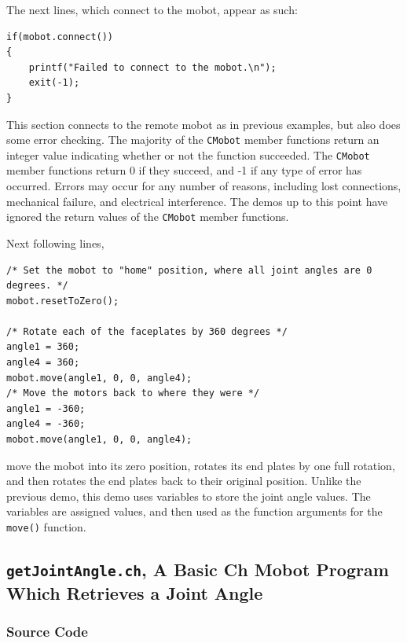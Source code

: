 \documentclass{article}
\begin{document}
The next
lines, which connect to the mobot, appear as such:
\begin{verbatim}
if(mobot.connect())
{
    printf("Failed to connect to the mobot.\n");
    exit(-1);
}
\end{verbatim}
This section connects to the remote mobot as in previous examples, but also
does some error checking. The majority of the \texttt{CMobot} member functions
return an integer value indicating whether or not the function succeeded.
The \texttt{CMobot} member functions return 0 if they succeed, and -1
if any type of error has occurred. Errors may occur for any number of reasons,
including lost connections, mechanical failure, and electrical interference. 
The demos up to this point have ignored the return values of the 
\texttt{CMobot} member functions.

Next following lines,
\begin{verbatim}
/* Set the mobot to "home" position, where all joint angles are 0 degrees. */
mobot.resetToZero();

/* Rotate each of the faceplates by 360 degrees */
angle1 = 360;
angle4 = 360;
mobot.move(angle1, 0, 0, angle4);
/* Move the motors back to where they were */
angle1 = -360;
angle4 = -360;
mobot.move(angle1, 0, 0, angle4);
\end{verbatim}
move the mobot into its zero position, rotates its end plates by one full rotation, and then
rotates the end plates back to their original position. Unlike the previous demo, this 
demo uses variables to store the joint angle values. The variables are assigned 
values, and then used as the function arguments for the \texttt{move()} function.

\subsection{\texttt{getJointAngle.ch}, A Basic Ch Mobot Program Which Retrieves a Joint Angle}
\subsubsection{Source Code}

\end{document}
